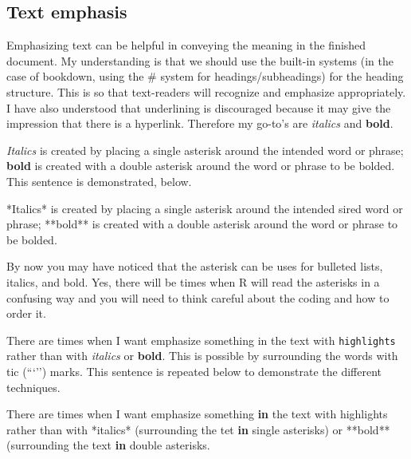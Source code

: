 \documentclass[
]{book}
\newenvironment{Shaded}{\begin{snugshade}}{\end{snugshade}}
\newcommand{\AttributeTok}[1]{\textcolor[rgb]{0.77,0.63,0.00}{#1}}
\newcommand{\ControlFlowTok}[1]{\textcolor[rgb]{0.13,0.29,0.53}{\textbf{#1}}}
\newcommand{\NormalTok}[1]{#1}
\newcommand{\SpecialCharTok}[1]{\textcolor[rgb]{0.00,0.00,0.00}{#1}}
\newcommand{\StringTok}[1]{\textcolor[rgb]{0.31,0.60,0.02}{#1}}
\begin{document}
\hypertarget{text-emphasis}{%
\subsection{Text emphasis}\label{text-emphasis}}

Emphasizing text can be helpful in conveying the meaning in the finished document. My understanding is that we should use the built-in systems (in the case of bookdown, using the \# system for headings/subheadings) for the heading structure. This is so that text-readers will recognize and emphasize appropriately. I have also understood that underlining is discouraged because it may give the impression that there is a hyperlink. Therefore my go-to's are \emph{italics} and \textbf{bold}.

\emph{Italics} is created by placing a single asterisk around the intended word or phrase; \textbf{bold} is created with a double asterisk around the word or phrase to be bolded. This sentence is demonstrated, below.

\begin{Shaded}
\begin{Highlighting}[]
\SpecialCharTok{*}\NormalTok{Italics}\SpecialCharTok{*}\NormalTok{ is created by placing a single asterisk around the intended sired word or phrase; }\SpecialCharTok{**}\NormalTok{bold}\SpecialCharTok{**}\NormalTok{ is created with a double asterisk around the word or phrase to be bolded.}
\end{Highlighting}
\end{Shaded}

By now you may have noticed that the asterisk can be uses for bulleted lists, italics, and bold. Yes, there will be times when R will read the asterisks in a confusing way and you will need to think careful about the coding and how to order it.

There are times when I want emphasize something in the text with \texttt{highlights} rather than with \emph{italics} or \textbf{bold}. This is possible by surrounding the words with tic (```'') marks. This sentence is repeated below to demonstrate the different techniques.

\begin{Shaded}
\begin{Highlighting}[]
\NormalTok{There are times when I want emphasize something }\ControlFlowTok{in}\NormalTok{ the text with }\StringTok{\textasciigrave{}}\AttributeTok{highlights}\StringTok{\textasciigrave{}}\NormalTok{ rather than with }\SpecialCharTok{*}\NormalTok{italics}\SpecialCharTok{*}\NormalTok{ (surrounding the tet }\ControlFlowTok{in}\NormalTok{ single asterisks) or }\SpecialCharTok{**}\NormalTok{bold}\SpecialCharTok{**}\NormalTok{ (surrounding the text }\ControlFlowTok{in}\NormalTok{ double asterisks.}
\end{Highlighting}
\end{Shaded}
\end{document}
